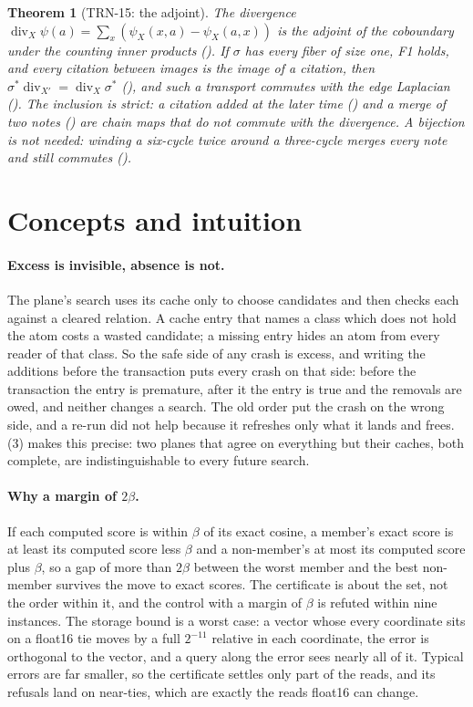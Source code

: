 \documentclass[11pt]{article}
\theoremstyle{plain}
\newtheorem{theorem}{Theorem}[section]
\theoremstyle{definition}
\theoremstyle{remark}
\begin{document}
\begin{theorem}[TRN-15: the adjoint]\label{thm:adj}
The divergence $\operatorname{div}_X\psi(a) = \sum_x (\psi_X(x, a) - \psi_X(a, x))$ is the adjoint
of the coboundary under the counting inner products (). If
$\sigma$ has every fiber of size one, F1 holds, and every citation between images is the image of
a citation, then $\sigma^*\operatorname{div}_{X'} = \operatorname{div}_X\sigma^*$
(), and such a transport commutes with the edge Laplacian
(). The inclusion is strict: a citation added at the later time
() and a merge of two notes () are chain maps
that do not commute with the divergence. A bijection is not needed: winding a six-cycle twice
around a three-cycle merges every note and still commutes ().
\end{theorem}

\section{Concepts and intuition}

\paragraph{Excess is invisible, absence is not.} The plane's search uses its cache only to choose
candidates and then checks each against a cleared relation. A cache entry that names a class
which does not hold the atom costs a wasted candidate; a missing entry hides an atom from every
reader of that class. So the safe side of any crash is excess, and writing the additions before
the transaction puts every crash on that side: before the transaction the entry is premature,
after it the entry is true and the removals are owed, and neither changes a search. The old order
put the crash on the wrong side, and a re-run did not help because it refreshes only what it
lands and frees. (3) makes this precise: two planes that agree on everything but
their caches, both complete, are indistinguishable to every future search.

\paragraph{Why a margin of $2\beta$.} If each computed score is within $\beta$ of its exact
cosine, a member's exact score is at least its computed score less $\beta$ and a non-member's at
most its computed score plus $\beta$, so a gap of more than $2\beta$ between the worst member and
the best non-member survives the move to exact scores. The certificate is about the set, not the
order within it, and the control with a margin of $\beta$ is refuted within nine instances. The
storage bound is a worst case: a vector whose every coordinate sits on a float16 tie moves by a
full $2^{-11}$ relative in each coordinate, the error is orthogonal to the vector, and a query
along the error sees nearly all of it. Typical errors are far smaller, so the certificate settles
only part of the reads, and its refusals land on near-ties, which are exactly the reads float16
can change.
\end{document}
